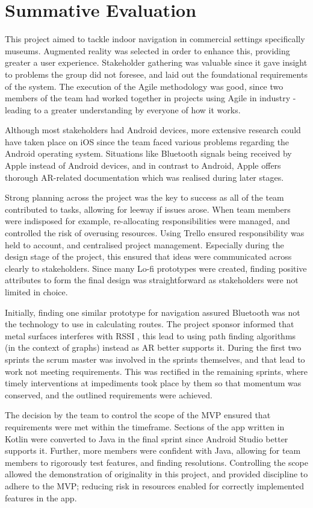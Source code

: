 \section{Summative Evaluation}
This project aimed to tackle indoor navigation in commercial settings specifically museums. Augmented reality was selected in order to enhance this, providing greater a user experience. Stakeholder gathering was valuable since it gave insight to problems the group did not foresee, and laid out the foundational requirements of the system. The execution of the Agile methodology was good, since two members of the team had worked together in projects using Agile in industry - leading to a greater understanding by everyone of how it works. 

Although most stakeholders had Android devices, more extensive research could have taken place on iOS since the team faced various problems regarding the Android operating system. Situations like Bluetooth signals being received by Apple instead of Android devices, and in contrast to Android, Apple offers thorough AR-related documentation which was realised during later stages.

Strong planning across the project was the key to success as all of the team contributed to tasks, allowing for leeway if issues arose. When team members were indisposed for example, re-allocating responsibilities were managed, and controlled the risk of overusing resources. Using Trello ensured responsibility was held to account, and centralised project management. Especially during the design stage of the project, this ensured that ideas were communicated across clearly to stakeholders. Since many Lo-fi prototypes were created, finding positive attributes to form the final design was straightforward as stakeholders were not limited in choice. 

Initially, finding one similar prototype for navigation assured Bluetooth was not the technology to use in calculating routes. The project sponsor informed that metal surfaces interferes with RSSI \cite{apple}, this lead to using path finding algorithms (in the context of graphs) instead as AR better supports it. During the first two sprints the scrum master was involved in the sprints themselves, and that lead to work not meeting requirements. This was rectified in the remaining sprints, where timely interventions at impediments took place by them so that momentum was conserved, and the outlined requirements were achieved.

The decision by the team to control the scope of the MVP ensured that requirements were met within the timeframe. Sections of the app written in Kotlin were converted to Java in the final sprint since Android Studio better supports it. Further, more members were confident with Java, allowing for team members to rigorously test features, and finding resolutions. Controlling the scope allowed the demonstration of originality in this project, and provided discipline to adhere to the MVP; reducing risk in resources enabled for correctly implemented features in the app.

